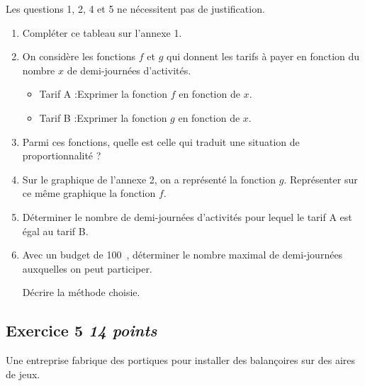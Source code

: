 \documentclass[10pt]{article}
\newcommand{\euro}{\eurologo{}}
\begin{document}
Les questions 1, 2, 4 et 5 ne nécessitent pas de justification. 

\medskip

\begin{enumerate}
    \item Compléter ce tableau sur l'annexe 1.
    \item On considère les fonctions $f$ et $g$ qui donnent les tarifs à payer en fonction du nombre $x$ de demi-journées d'activités.
   
    \begin{itemize}
        \item Tarif A :\quad Exprimer la fonction $f$ en fonction de $x$.
        \item Tarif B :\quad Exprimer la fonction $g$ en fonction de $x$.
    \end{itemize}

    \item Parmi ces fonctions, quelle est celle qui traduit une situation de proportionnalité ?
    \item Sur le graphique de l'annexe 2, on a représenté la fonction $g$. Représenter sur ce même graphique la fonction $f$.
    \item Déterminer le nombre de demi-journées d'activités pour lequel le tarif A est égal au tarif B.
    \item Avec un budget de 100~\euro, déterminer le nombre maximal de demi-journées auxquelles on peut participer.

    Décrire la méthode choisie.
\end{enumerate}

\newpage

\subsection*{Exercice 5 \hfill \textit{14 points}}

\medskip

Une entreprise fabrique des portiques pour installer des balançoires sur des aires de jeux.

\medskip
\end{document}
